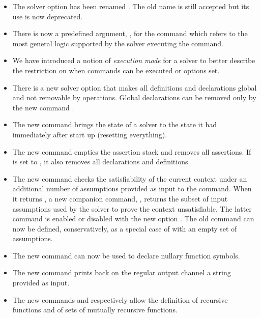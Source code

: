 \begin{itemize}
\item
The solver option  has been renamed 
.
The old name is still accepted but its use is now deprecated.

\item
There is now a predefined argument, , for the  command
which refers to the most general logic supported by the solver executing the command.

\item
We have introduced a notion of \emph{execution mode} for a solver
to better describe the restriction on when commands can be executed 
or options set.

\item
There is a new solver option  
that makes all definitions and declarations global and 
not removable by  operations.
Global declarations can be removed only 
by the new command .

\item
The new command  brings the state of a solver
to the state it had immediately after start up (resetting everything).

\item
The new command  empties the assertion stack
and removes all assertions.
If  is set to , it also removes 
all declarations and definitions.

\item
The new command  checks the satisfiability 
of the current context under an additional number of assumptions provided 
as input to the command.
When it returns , a new companion command, 
, returns the subset of input assumptions
used by the solver to prove the context unsatisfiable. 
The latter command is enabled or disabled with the new option 
.
The old  command can now be defined, conservatively,
as a special case of  with an empty set of assumptions.

\item
The new command  can now be used to declare 
nullary function symbols.

\item
The new command  prints back on the regular output channel
a string provided as input.

\item
The new commands  and  respectively
allow the definition of recursive functions and of sets of mutually recursive
functions.


\end{itemize}
